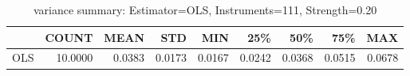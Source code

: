 \begin{table}[ht]
\centering
\caption{variance summary: Estimator=OLS, Instruments=111, Strength=0.20}
\begin{tabular}{lrrrrrrrr}
\toprule
 & COUNT & MEAN & STD & MIN & 25\% & 50\% & 75\% & MAX \\
\midrule
OLS & 10.0000 & 0.0383 & 0.0173 & 0.0167 & 0.0242 & 0.0368 & 0.0515 & 0.0678 \\
\bottomrule
\end{tabular}
\end{table}
